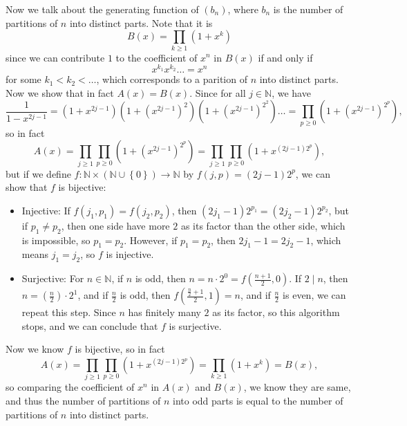 \documentclass[a4paper,12pt]{article}
\begin{document}
Now we talk about the generating function of \((b_n)\), where \(b_n\) is the number of partitions of \(n\) into distinct parts. Note that it is 
\[
	B(x) = \prod _{k \ge 1} \left( 1 + x^k \right) 
\] since we can contribute \(1\) to the coefficient of \(x^n\) in \(B(x)\) if and only if 
\[
	x^{k_1} x^{k_2} \dots = x^n
\] for some \(k_1 < k_2 < \dots \), which corresponds to a parition of \(n\) into distinct parts. Now we show that in fact \(A(x) = B(x)\). Since for all \(j \in \mathbb{N} \), we have 
\[
	\frac{1}{1 - x^{2j - 1}} = \left( 1 + x^{2j - 1} \right) \left( 1 + \left( x^{2j - 1} \right)^2  \right) \left( 1 + \left( x^{2j - 1} \right)^{2^2}  \right) \dots = \prod _{p \ge 0} \left( 1 + \left( x^{2j - 1} \right)^{2^p}  \right),   
\]  
so in fact 
\[
	A(x) = \prod _{j \ge 1} \prod _{p \ge 0} \left( 1 + \left( x^{2j - 1} \right)^{2^p}  \right) = \prod _{j \ge 1} \prod _{p \ge 0} \left( 1 + x^{(2j - 1)2^p} \right), 
\] but if we define \(f: \mathbb{N} \times (\mathbb{N} \cup \left\{ 0 \right\} ) \to \mathbb{N} \) by \(f(j, p) = (2j - 1)2^p\), we can show that \(f\) is bijective: 
\begin{itemize}
	\item Injective: If \(f(j_1, p_1) = f(j_2, p_2)\), then \((2j_1 - 1)2^{p_1} = (2j_2 - 1)2^{p_2}\), but if \(p_1 \neq p_2\), then one side have more \(2\) as its factor than the other side, which is impossible, so \(p_1 = p_2\). However, if \(p_1 = p_2\), then \(2 j_1 - 1 = 2j_2 - 1\), which means \(j_1 = j_2\), so \(f\) is injective. 
	\item Surjective: For \(n \in \mathbb{N} \), if \(n\) is odd, then \(n = n \cdot 2^0 = f \left( \frac{n+1}{2}, 0 \right) \). If \(2 \mid n\), then \(n = \left( \frac{n}{2} \right) \cdot 2^1 \), and if \(\frac{n}{2}\) is odd, then \(f \left( \frac{\frac{n}{2} + 1}{2}, 1 \right) = n \), and if \(\frac{n}{2}\) is even, we can repeat this step. Since \(n\) has finitely many \(2\) as its factor, so this algorithm stops, and we can conclude that \(f\) is surjective.                    
\end{itemize} 
Now we know \(f\) is bijective, so in fact 
\[
	A(x) = \prod _{j \ge 1} \prod _{p \ge 0} \left( 1 + x^{(2j - 1)2^p} \right) = \prod _{k \ge 1} \left( 1 + x^k \right) = B(x),
\] so comparing the coefficient of \(x^n\) in \(A(x)\) and \(B(x)\), we know they are same, and thus the number of partitions of \(n\) into odd parts is equal to the number of partitions of \(n\) into distinct parts.     
\end{document}
